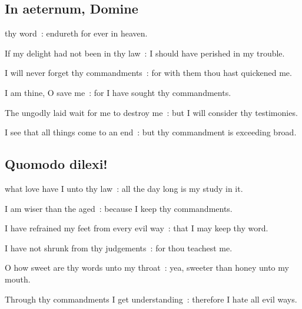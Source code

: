 \clearpage
\subsection{In aeternum, Domine}
 thy word~: endureth for ever in heaven.\par
{}
If my delight had not been in thy law~: I should have perished in my trouble.\par
{}I will never forget thy commandments~: for with them thou hast quickened me.\par
{}I am thine, O save me~: for I have sought thy commandments.\par
{}The ungodly laid wait for me to destroy me~: but I will consider thy testimonies.\par
{}I see that all things come to an end~: but thy commandment is exceeding broad.\par

\vspace{-0.25\baselineskip}

\subsection{Quomodo dilexi!}

\vspace{-0.1\baselineskip}

 what love have I unto thy law~: all the day long is my study in it.\par
{}
I am wiser than the aged~: because I keep thy commandments.\par
{}I have refrained my feet from every evil way~: that I may keep thy word.\par
{}I have not shrunk from thy judgements~: for thou teachest me.\par
{}O how sweet are thy words unto my throat~: yea, sweeter than honey unto my mouth.\par
{}Through thy commandments I get understanding~: therefore I hate all evil ways.\par

